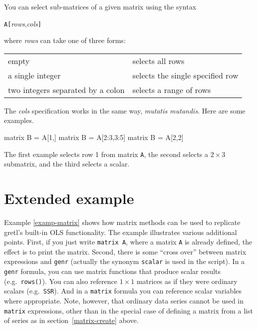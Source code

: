 You can select sub-matrices of a given matrix using the syntax

\texttt{A[}\textsl{rows},\textsl{cols}\texttt{]}

where \textsl{rows} can take one of three forms:

\begin{center}
\begin{tabular}{ll}
empty & selects all rows \\
a single integer & selects the single specified row \\
two integers separated by a colon & selects a range of rows 
\end{tabular}
\end{center}

The \textsl{cols} specification works in the same way, \textit{mutatis
  mutandis}.  Here are some examples.
%
\begin{code}
matrix B = A[1,]
matrix B = A[2:3,3:5]
matrix B = A[2,2]
\end{code}
%
The first example selects row 1 from matrix \texttt{A}, the second
selects a $2\times 3$ submatrix, and the third selects a scalar.

\section{Extended example}
\label{matrix-example}

Example \ref{examp-matrix} shows how matrix methods can be used to
replicate gretl's built-in OLS functionality.  The example illustrates
various additional points.  First, if you just write \texttt{matrix
  A}, where a matrix \texttt{A} is already defined, the effect is to
print the matrix.  Second, there is some ``cross over'' between matrix
expressions and \texttt{genr} (actually the synonym \texttt{scalar} is
used in the script).  In a \texttt{genr} formula, you can use matrix
functions that produce scalar results (e.g.\ \texttt{rows()}).  You
can also reference $1\times 1$ matrices as if they were ordinary
scalars (e.g.\ \texttt{SSR}).  And in a \texttt{matrix} formula you
can reference scalar variables where appropriate.  Note, however, that
ordinary data series cannot be used in \texttt{matrix} expressions,
other than in the special case of defining a matrix from a list of
series as in section~\ref{matrix-create} above.

